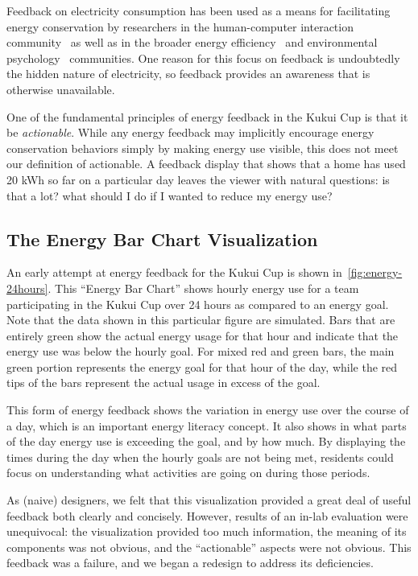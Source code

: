 \documentclass[10pt, conference, compsocconf]{IEEEtran}
\begin{document}
Feedback on electricity consumption has been used as a means for facilitating energy conservation by researchers in the human-computer interaction community~\cite{Froehlich2010} as well as in the broader energy efficiency~\cite{darby-review-2006, Faruqui09, Foster-2012} and environmental psychology~\cite{Becker78, Houwelingen89} communities. One reason for this focus on feedback is undoubtedly the hidden nature of electricity, so feedback provides an awareness that is otherwise unavailable.

One of the fundamental principles of energy feedback in the Kukui Cup is that it be \emph{actionable}. While any energy feedback may implicitly encourage energy conservation behaviors simply by making energy use visible, this does not meet our definition of actionable. A feedback display that shows that a home has used 20 kWh so far on a particular day leaves the viewer with natural questions: is that a lot? what should I do if I wanted to reduce my energy use?


\subsection{The Energy Bar Chart Visualization}


An early attempt at energy feedback for the Kukui Cup is shown in~\autoref{fig:energy-24hours}. This ``Energy Bar Chart'' shows hourly energy use for a team participating in the Kukui Cup over 24 hours as compared to an energy goal. Note that the data shown in this particular figure are simulated. Bars that are entirely green show the actual energy usage for that hour and indicate that the energy use was below the hourly goal. For mixed red and green bars, the main green portion represents the energy goal for that hour of the day, while the red tips of the bars represent the actual usage in excess of the goal.

This form of energy feedback shows the variation in energy use over the course of a day, which is an important energy literacy concept. It also shows in what parts of the day energy use is exceeding the goal, and by how much. By displaying the times during the day when the hourly goals are not being met, residents could focus on understanding what activities are going on during those periods.

As (naive) designers, we felt that this visualization provided a great deal of useful feedback both clearly and concisely. However, results of an in-lab evaluation were unequivocal: the visualization provided too much information, the meaning of its components was not obvious, and the ``actionable'' aspects were not obvious. This feedback was a failure, and we began a redesign to address its deficiencies.
\end{document}
